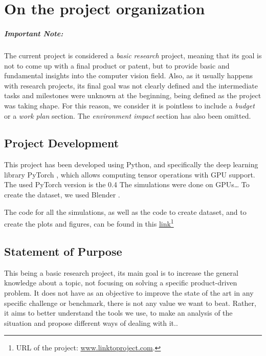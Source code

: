 \chapter{On the project organization}
\label{chapter:project_organization}

\paragraph{Important Note:} The current project is considered a \emph{basic research} project, meaning that its goal is not to come up with a final product or patent, but to provide basic and fundamental insights into the computer vision field. Also, as it usually happens with research projects, its final goal was not clearly defined and the intermediate tasks and milestones were unknown at the beginning, being defined as the project was taking shape. For this reason, we consider it is pointless to include a \emph{budget} or a \emph{work plan} section. The \emph{environment impact} section has also been omitted.

\section{Project Development}
\label{section:development}
This project has been developed using Python, and specifically the deep learning library PyTorch \cite{paszke2017pytorch}, which allows computing tensor operations with \ac{GPU} support. The used PyTorch version is the 0.4
The simulations were done on GPUs\dots
To create the dataset, we used Blender \cite{blender}.

The code for all the simulations, as well as the code to create dataset, and to create the plots and figures, can be found in this
\href{www.linktoproject.com}{\underline{link}}\footnote{URL of the project: \url{www.linktoproject.com}.}

\section{Statement of Purpose}
\label{section:sop}
This being a basic research project, its main goal is to increase the general knowledge about a topic, not focusing on solving a specific product-driven problem. It does not have as an objective to improve the state of the art in any specific challenge or benchmark, there is not any value we want to beat. Rather, it aims to better understand the tools we use, to make an analysis of the situation and propose different ways of dealing with it..

